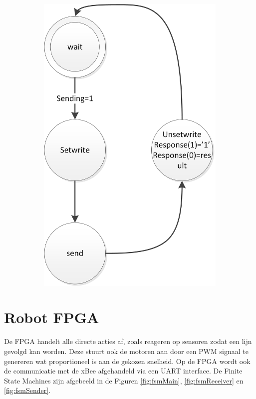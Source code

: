 \documentclass{report}
\begin{document}
\begin{figure}
\begin{subfigure}{0.23\linewidth}
\includegraphics[width=\linewidth]{FSMSender}
\end{subfigure}
\end{figure}
\section{Robot FPGA}
De FPGA handelt alle directe acties af, zoals reageren op sensoren zodat een lijn gevolgd kan worden.
Deze stuurt ook de motoren aan door een PWM signaal te genereren wat proportioneel is aan de gekozen snelheid.
Op de FPGA wordt ook de communicatie met de xBee afgehandeld via een UART interface.
De Finite State Machines zijn afgebeeld in de Figuren \ref{fig:fsmMain}, \ref{fig:fsmReceiver} en \ref{fig:fsmSender}.
\end{document}
